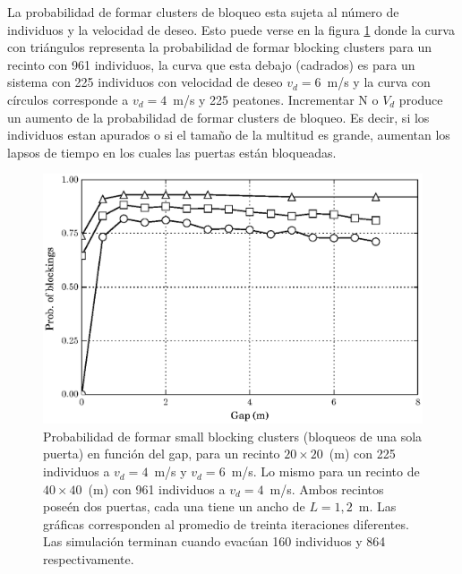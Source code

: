 La probabilidad de formar clusters de bloqueo esta sujeta al número de individuos y la velocidad de deseo. Esto puede verse en la figura \ref{proba_vsgap_all} donde la curva con triángulos representa la probabilidad de formar blocking clusters para un recinto con 961 individuos, la curva que esta debajo (cadrados) es para un sistema con 225 individuos con velocidad de deseo $v_d=6$~m/s y la curva con círculos corresponde a $v_d=4$~m/s y 225 peatones. Incrementar N o $V_d$ produce un aumento de la probabilidad de formar clusters de bloqueo. Es decir, si los individuos estan apurados o si el tamaño de la multitud es grande, aumentan los lapsos de tiempo en los cuales las puertas están bloqueadas.  

\begin{figure}[H]
    \centering
    \includegraphics[scale=0.8]{figuras/proba_vsgap_all_big.eps}
    \caption[width=5cm]{Probabilidad de formar small blocking clusters (bloqueos de una sola puerta) en función del gap, para un recinto $20\times 20$~(m) con 225 individuos a $v_d=4$~m/s y $v_d=6$~m/s. Lo mismo para un recinto de $40\times 40$~(m) con 961 individuos a $v_d=4$~m/s. Ambos recintos poseén dos puertas, cada una tiene un ancho de $L=1,2$~m. Las gráficas corresponden al promedio de treinta iteraciones diferentes. Las simulación terminan cuando evacúan 160 individuos y 864 respectivamente.}
    \label{proba_vsgap_all}
\end{figure}


